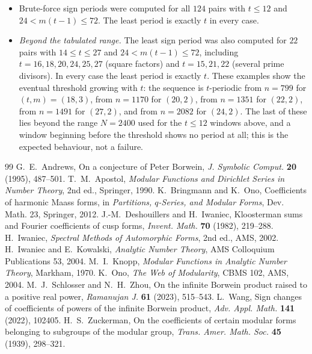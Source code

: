 \documentclass[11pt]{amsart}
\theoremstyle{definition}\newtheorem{definition}[theorem]{Definition}
\theoremstyle{remark}\newtheorem{remark}[theorem]{Remark}
\begin{document}
\begin{itemize}[leftmargin=1.5em]
\begin{itemize}[leftmargin=1.5em]
\end{itemize}
\item Brute-force sign periods were computed for all $124$ pairs with $t\le12$ and $24<m(t-1)\le72$. The least period is exactly $t$ in every case.
\item \emph{Beyond the tabulated range.} The least sign period was also computed for $22$ pairs with $14\le t\le27$ and $24<m(t-1)\le72$, including $t=16,18,20,24,25,27$ (square factors) and $t=15,21,22$ (several prime divisors). In every case the least period is exactly $t$. These examples show the eventual threshold growing with $t$: the sequence is $t$-periodic from $n=799$ for $(t,m)=(18,3)$, from $n=1170$ for $(20,2)$, from $n=1351$ for $(22,2)$, from $n=1491$ for $(27,2)$, and from $n=2082$ for $(24,2)$. The last of these lies beyond the range $N=2400$ used for the $t\le12$ windows above, and a window beginning before the threshold shows no period at all; this is the expected behaviour, not a failure.
\end{itemize}

\begin{thebibliography}{99}
 G.~E.~Andrews, On a conjecture of Peter Borwein, \emph{J. Symbolic Comput.} \textbf{20} (1995), 487--501.
 T.~M.~Apostol, \emph{Modular Functions and Dirichlet Series in Number Theory}, 2nd ed., Springer, 1990.
 K.~Bringmann and K.~Ono, Coefficients of harmonic Maass forms, in \emph{Partitions, $q$-Series, and Modular Forms}, Dev. Math. 23, Springer, 2012.
 J.-M.~Deshouillers and H.~Iwaniec, Kloosterman sums and Fourier coefficients of cusp forms, \emph{Invent. Math.} \textbf{70} (1982), 219--288.
 H.~Iwaniec, \emph{Spectral Methods of Automorphic Forms}, 2nd ed., AMS, 2002.
 H.~Iwaniec and E.~Kowalski, \emph{Analytic Number Theory}, AMS Colloquium Publications 53, 2004.
 M.~I.~Knopp, \emph{Modular Functions in Analytic Number Theory}, Markham, 1970.
 K.~Ono, \emph{The Web of Modularity}, CBMS 102, AMS, 2004.
 M.~J.~Schlosser and N.~H.~Zhou, On the infinite Borwein product raised to a positive real power, \emph{Ramanujan J.} \textbf{61} (2023), 515--543.
 L.~Wang, Sign changes of coefficients of powers of the infinite Borwein product, \emph{Adv. Appl. Math.} \textbf{141} (2022), 102405.
 H.~S.~Zuckerman, On the coefficients of certain modular forms belonging to subgroups of the modular group, \emph{Trans. Amer. Math. Soc.} \textbf{45} (1939), 298--321.
\end{thebibliography}
\end{document}
